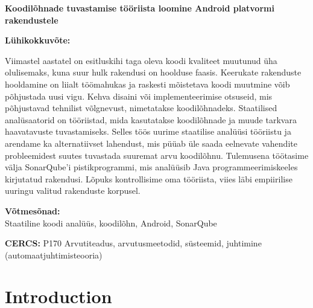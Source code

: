 \documentclass[12pt]{article}
\begin{document}
    \newcommand\EstInfo{{%
    \selectlanguage{estonian}
    \noindent\textbf{\large Koodilõhnade tuvastamise tööriista loomine Android platvormi rakendustele}
    \vspace*{1ex}

    \noindent\textbf{Lühikokkuvõte:}

    \noident
    Viimastel aastatel on esitluskihi taga oleva koodi kvaliteet muutunud üha olulisemaks, kuna suur hulk rakendusi on hoolduse faasis.
    Keerukate rakenduste hooldamine on liialt töömahukas ja raskesti mõistetava koodi muutmine võib põhjustada uusi vigu.
    Kehva disaini või implementeerimise otsuseid, mis põhjustavad tehnilist võlgnevust, nimetatakse koodilõhnadeks.
    Staatilised analüsaatorid on tööriistad, mida kasutatakse koodilõhnade ja muude tarkvara haavatavuste tuvastamiseks.
    Selles töös uurime staatilise analüüsi tööriistu ja arendame ka alternatiivset lahendust,
    mis püüab üle saada eelnevate vahendite probleemidest suutes tuvastada suuremat arvu koodilõhnu.
    Tulemusena töötasime välja SonarQube'i pistikprogrammi, mis analüüsib Java programmeerimiskeeles kirjutatud rakendusi.
    Lõpuks kontrollisime oma tööriista, viies läbi empiirilise uuringu valitud rakenduste korpusel.

    \vspace*{1ex}

    \noindent\textbf{Võtmesõnad:}\\
    Staatiline koodi analüüs, koodilõhn, Android, SonarQube

    \vspace*{1ex}

    \noindent\textbf{CERCS:} P170 Arvutiteadus, arvutusmeetodid, süsteemid, juhtimine (automaatjuhtimisteooria)

    \vspace*{1ex}
    }}%


    \EngInfo

    \newpage
    \EstInfo


    \newpage
    \tableofcontents

    \newpage

    \section{Introduction}\label{sec:introduction}

    
\end{document}
